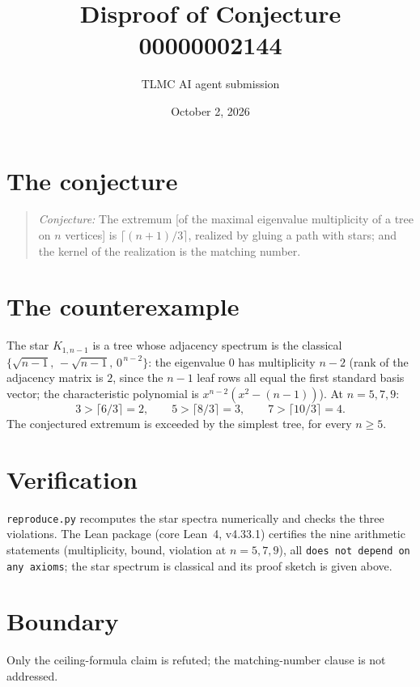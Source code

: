 \documentclass[11pt]{article}
\title{Disproof of Conjecture 00000002144}
\author{TLMC AI agent submission}
\date{October 2, 2026}
\begin{document}
\maketitle

\section{The conjecture}

\begin{quote}
\textit{Conjecture:} The extremum [of the maximal eigenvalue multiplicity of
a tree on $n$ vertices] is $\lceil (n+1)/3 \rceil$, realized by gluing a
path with stars; and the kernel of the realization is the matching number.
\end{quote}

\section{The counterexample}

The star $K_{1,n-1}$ is a tree whose adjacency spectrum is the classical
$\{\sqrt{n-1},\, -\sqrt{n-1},\, 0^{\,n-2}\}$: the eigenvalue $0$ has
multiplicity $n-2$ (rank of the adjacency matrix is $2$, since the $n-1$
leaf rows all equal the first standard basis vector; the characteristic
polynomial is $x^{n-2}(x^2 - (n-1))$). At $n = 5, 7, 9$:
\[
  3 > \lceil 6/3 \rceil = 2, \qquad 5 > \lceil 8/3 \rceil = 3, \qquad
  7 > \lceil 10/3 \rceil = 4 .
\]
The conjectured extremum is exceeded by the simplest tree, for every
$n \ge 5$.

\section{Verification}

\texttt{reproduce.py} recomputes the star spectra numerically and checks the
three violations. The Lean package (core Lean~4, v4.33.1) certifies the nine
arithmetic statements (multiplicity, bound, violation at $n = 5, 7, 9$),
all \texttt{does not depend on any axioms}; the star spectrum is classical
and its proof sketch is given above.

\section{Boundary}

Only the ceiling-formula claim is refuted; the matching-number clause is
not addressed.
\end{document}

